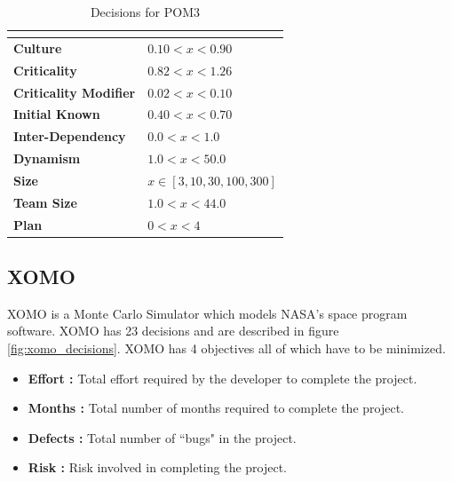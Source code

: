\documentclass[conference]{IEEEtran}
\begin{document}
	\begin{table}[t]
	    \centering
		\begin{tabular}{ll}
			\hline
			\rowcolor[HTML]{EFEFEF} 
			\multicolumn{1}{l}{\cellcolor[HTML]{EFEFEF}{\bf Decision}} & \multicolumn{1}{c}{\cellcolor[HTML]{EFEFEF}{\bf  Range}}  \\ \hline
			\rowcolor[HTML]{FFFFFF} 
			{\bf Culture}  & $0.10<x<0.90$\\
			\rowcolor[HTML]{FFFFFF} 
			{\bf Criticality} & $0.82<x<1.26$\\
			\rowcolor[HTML]{FFFFFF} 
			{\bf Criticality Modifier} & $0.02<x<0.10$\\
			\rowcolor[HTML]{FFFFFF} 
			{\bf Initial Known} & $0.40<x<0.70$\\
			\rowcolor[HTML]{FFFFFF} 
			{\bf Inter-Dependency} & $0.0<x<1.0$\\
			\rowcolor[HTML]{FFFFFF} 
			{\bf Dynamism} & $1.0<x<50.0$\\
			\rowcolor[HTML]{FFFFFF} 
			{\bf Size} & $x \in [3,10,30,100,300]$\\
			\rowcolor[HTML]{FFFFFF} 
			{\bf Team Size} & $1.0<x<44.0$\\
			\rowcolor[HTML]{FFFFFF} 
			{\bf Plan} & $0<x<4$\\
		\end{tabular}
		\caption{Decisions for POM3}
		\label{fig:pom3_decisions}
	\end{table}
	
	
	\subsection{XOMO}
	\label{xomo}
	XOMO is a Monte Carlo Simulator which models NASA's space program software\cite{menzies05xomo}. XOMO has 23 decisions and are described in figure \ref{fig:xomo_decisions}. XOMO has 4 objectives all of which have to be minimized.
	
	\begin{itemize}
	\item \textbf{Effort :} Total effort required by the developer to complete the project.
	\item \textbf{Months :} Total number of months required to complete the project.
	\item \textbf{Defects :} Total number of ``bugs" in the project.
	\item \textbf{Risk :} Risk involved in completing the project.
	\end{itemize}
	
\end{document}
